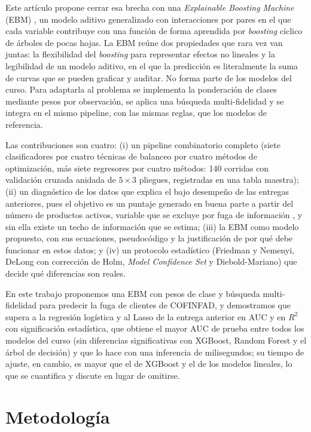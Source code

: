 \documentclass[pdflatex,sn-mathphys-num]{sn-jnl}
\begin{document}
Este artículo propone cerrar esa brecha con una \textit{Explainable Boosting Machine} (EBM) \cite{lou2012intelligible,lou2013ga2m,nori2019interpretml}, un modelo aditivo generalizado con interacciones por pares en el que cada variable contribuye con una función de forma aprendida por \textit{boosting} cíclico de árboles de pocas hojas. La EBM reúne dos propiedades que rara vez van juntas: la flexibilidad del \textit{boosting} para representar efectos no lineales y la legibilidad de un modelo aditivo, en el que la predicción es literalmente la suma de curvas que se pueden graficar y auditar. No forma parte de los modelos del curso. Para adaptarla al problema se implementa la ponderación de clases mediante pesos por observación, se aplica una búsqueda multi-fidelidad y se integra en el mismo pipeline, con las mismas reglas, que los modelos de referencia.

Las contribuciones son cuatro: (i) un pipeline combinatorio completo (siete clasificadores por cuatro técnicas de balanceo por cuatro métodos de optimización, más siete regresores por cuatro métodos: 140 corridas con validación cruzada anidada de $5\times3$ pliegues, registradas en una tabla maestra); (ii) un diagnóstico de los datos que explica el bajo desempeño de las entregas anteriores, pues el objetivo es un puntaje generado en buena parte a partir del número de productos activos, variable que se excluye por fuga de información \cite{kaufman2012leakage}, y sin ella existe un techo de información que se estima; (iii) la EBM como modelo propuesto, con sus ecuaciones, pseudocódigo y la justificación de por qué debe funcionar en estos datos; y (iv) un protocolo estadístico (Friedman y Nemenyi, DeLong con corrección de Holm, \textit{Model Confidence Set} y Diebold-Mariano) que decide qué diferencias son reales.

En este trabajo proponemos una EBM con pesos de clase y búsqueda multi-fidelidad para predecir la fuga de clientes de COFINFAD, y demostramos que supera a la regresión logística y al Lasso de la entrega anterior en AUC y en $R^2$ con significación estadística, que obtiene el mayor AUC de prueba entre todos los modelos del curso (sin diferencias significativas con XGBoost, Random Forest y el árbol de decisión) y que lo hace con una inferencia de milisegundos; su tiempo de ajuste, en cambio, es mayor que el de XGBoost y el de los modelos lineales, lo que se cuantifica y discute en lugar de omitirse.

\section{Metodología}\label{sec:metodo}
\end{document}
